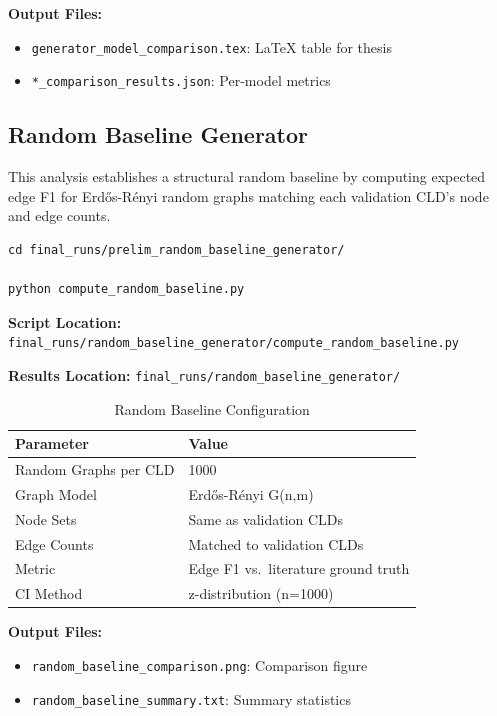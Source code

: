 \textbf{Output Files:}
\begin{itemize}[noitemsep]
    \item \texttt{generator\_model\_comparison.tex}: LaTeX table for thesis
    \item \texttt{*\_comparison\_results.json}: Per-model metrics
\end{itemize}

\subsection{Random Baseline Generator}
\label{sec:random_baseline}

This analysis establishes a structural random baseline by computing expected edge F1 for Erd\H{o}s-R\'enyi random graphs matching each validation CLD's node and edge counts.

\begin{verbatim}
cd final_runs/prelim_random_baseline_generator/

python compute_random_baseline.py
\end{verbatim}

\textbf{Script Location:} \texttt{final\_runs/random\_baseline\_generator/compute\_random\_baseline.py}

\textbf{Results Location:} \texttt{final\_runs/random\_baseline\_generator/}

\begin{table}[H]
\centering
\caption{Random Baseline Configuration}
\label{tab:random_baseline_config}
\footnotesize
\begin{tabular}{@{}ll@{}}
\toprule
\textbf{Parameter} & \textbf{Value} \\
\midrule
Random Graphs per CLD & 1000 \\
Graph Model & Erd\H{o}s-R\'enyi G(n,m) \\
Node Sets & Same as validation CLDs \\
Edge Counts & Matched to validation CLDs \\
Metric & Edge F1 vs.\ literature ground truth \\
CI Method & z-distribution (n=1000) \\
\bottomrule
\end{tabular}
\end{table}

\textbf{Output Files:}
\begin{itemize}[noitemsep]
    \item \texttt{random\_baseline\_comparison.png}: Comparison figure
    \item \texttt{random\_baseline\_summary.txt}: Summary statistics
\end{itemize}


